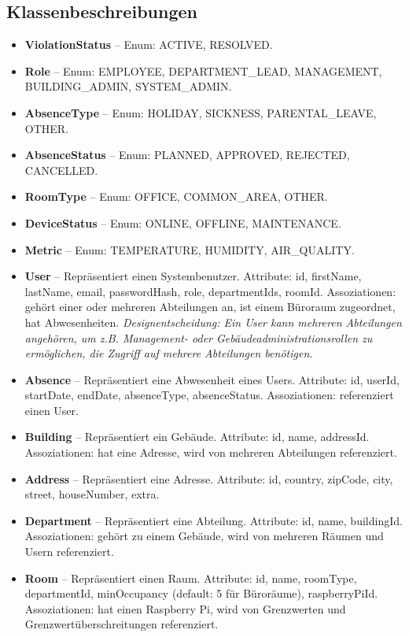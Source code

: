 \documentclass[12pt,a4paper]{article}
\begin{document}
\subsection{Klassenbeschreibungen}
\begin{itemize}
	\item \textbf{ViolationStatus} -- Enum: ACTIVE, RESOLVED.
	\item \textbf{Role} -- Enum: EMPLOYEE, DEPARTMENT\_LEAD, MANAGEMENT, BUILDING\_ADMIN, SYSTEM\_ADMIN.
	\item \textbf{AbsenceType} -- Enum: HOLIDAY, SICKNESS, PARENTAL\_LEAVE, OTHER.
	\item \textbf{AbsenceStatus} -- Enum: PLANNED, APPROVED, REJECTED, CANCELLED.
	\item \textbf{RoomType} -- Enum: OFFICE, COMMON\_AREA, OTHER.
	\item \textbf{DeviceStatus} -- Enum: ONLINE, OFFLINE, MAINTENANCE.
	\item \textbf{Metric} -- Enum: TEMPERATURE, HUMIDITY, AIR\_QUALITY.
	\item \textbf{User} -- Repräsentiert einen Systembenutzer. Attribute: id, firstName, lastName, email, passwordHash, role, departmentIds, roomId. Assoziationen: gehört einer oder mehreren Abteilungen an, ist einem Büroraum zugeordnet, hat Abwesenheiten. \textit{Designentscheidung: Ein User kann mehreren Abteilungen angehören, um z.B. Management- oder Gebäudeadministrationsrollen zu ermöglichen, die Zugriff auf mehrere Abteilungen benötigen.}
	\item \textbf{Absence} -- Repräsentiert eine Abwesenheit eines Users. Attribute: id, userId, startDate, endDate, absenceType, absenceStatus. Assoziationen: referenziert einen User.
	\item \textbf{Building} -- Repräsentiert ein Gebäude. Attribute: id, name, addressId. Assoziationen: hat eine Adresse, wird von mehreren Abteilungen referenziert.
	\item \textbf{Address} -- Repräsentiert eine Adresse. Attribute: id, country, zipCode, city, street, houseNumber, extra.
	\item \textbf{Department} -- Repräsentiert eine Abteilung. Attribute: id, name, buildingId. Assoziationen: gehört zu einem Gebäude, wird von mehreren Räumen und Usern referenziert.
	\item \textbf{Room} -- Repräsentiert einen Raum. Attribute: id, name, roomType, departmentId, minOccupancy (default: 5 für Büroräume), raspberryPiId. Assoziationen: hat einen Raspberry Pi, wird von Grenzwerten und Grenzwertüberschreitungen referenziert.

\end{itemize}
\end{document}
